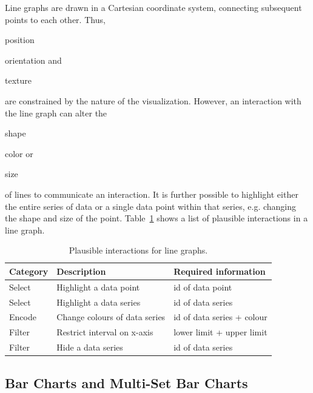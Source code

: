 Line graphs are drawn in a Cartesian coordinate system, connecting subsequent points to each other.
Thus,
\begin{enumerate*}[label=(\arabic*)]
    \item position
    \item orientation and
    \item texture
\end{enumerate*}
are constrained by the nature of the visualization.
However, an interaction with the line graph can alter the
\begin{enumerate*}[label=(\arabic*)]
    \item shape
    \item color or
    \item size
\end{enumerate*}
of lines to communicate an interaction.
It is further possible to highlight either the entire series of data or a single data point within that series, e.g. changing the shape and size of the point.
Table~\ref{tab:analysis:line-graph:interactions} shows a list of plausible interactions in a line graph.

\begin{table}[H]
  \centering
  \caption{Plausible interactions for line graphs.}%
  \label{tab:analysis:line-graph:interactions}
  \begin{tabularx}{\linewidth}{lXX}
    \bf Category & \bf Description & \bf Required information \\
    \hline
    Select & Highlight a data point & id of data point \\
    Select & Highlight a data series & id of data series \\
    Encode & Change colours of data series & id of data series + colour \\
    Filter & Restrict interval on x-axis & lower limit + upper limit \\
    Filter & Hide a data series & id of data series \\
  \end{tabularx}
\end{table}




\subsection{Bar Charts and Multi-Set Bar Charts}

